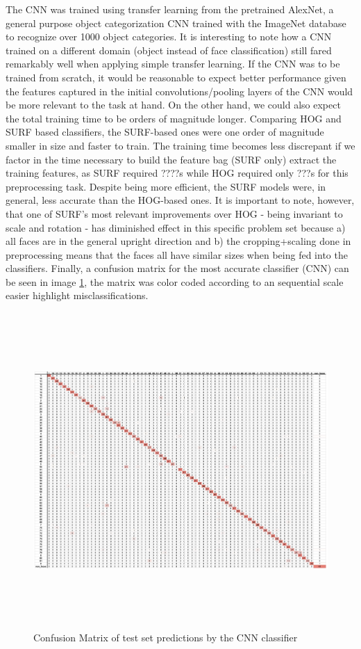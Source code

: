 \documentclass[11pt]{article}
\begin{document}
        The CNN was trained using transfer learning from the pretrained AlexNet, a general purpose object categorization CNN trained with the ImageNet database to recognize over 1000 object categories. It is interesting to note how a CNN trained on a different domain (object instead of face classification) still fared remarkably well when applying simple transfer learning. If the CNN was to be trained from scratch, it would be reasonable to expect better performance given the features captured in the initial convolutions/pooling layers of the CNN would be more relevant to the task at hand. On the other hand, we could also expect the total training time to be orders of magnitude longer.
        Comparing HOG and SURF based classifiers, the SURF-based ones were one order of magnitude smaller in size and faster to train. The training time becomes less discrepant if we factor in the time necessary to build the feature bag (SURF only) extract the training features, as SURF required ????s while HOG required only ???s for this preprocessing task. Despite being more efficient, the SURF models were, in general, less accurate than the HOG-based ones. It is important to note, however, that one of SURF's most relevant improvements over HOG - being invariant to scale and rotation - has diminished effect in this specific problem set because a) all faces are in the general upright direction and b) the cropping+scaling done in preprocessing means that the faces all have similar sizes when being fed into the classifiers.
        Finally, a confusion matrix for the most accurate classifier (CNN) can be seen in image \ref{fig:results:confusion_matrix}, the matrix was color coded according to an sequential scale easier highlight misclassifications.

        \begin{figure}[t]
            \centering
            \includegraphics[height=12cm]{./Images/results/confusion_matrix.png}
            \caption{Confusion Matrix of test set predictions by the CNN classifier}
            \label{fig:results:confusion_matrix}
        \end{figure}
\end{document}
